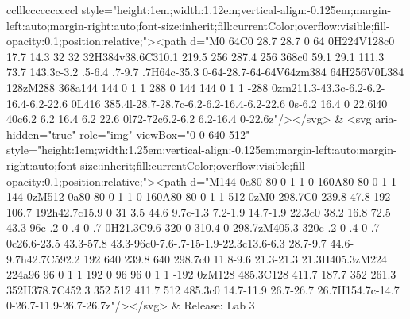 \documentclass[
]{article}
\begin{document}
\begin{figure*}
\begin{longtable*}{cclllccccccccccl}
style="height:1em;width:1.12em;vertical-align:-0.125em;margin-left:auto;margin-right:auto;font-size:inherit;fill:currentColor;overflow:visible;fill-opacity:0.1;position:relative;"><path d="M0 64C0 28.7 28.7 0 64 0H224V128c0 17.7 14.3 32 32 32H384v38.6C310.1 219.5 256 287.4 256 368c0 59.1 29.1 111.3 73.7 143.3c-3.2 .5-6.4 .7-9.7 .7H64c-35.3 0-64-28.7-64-64V64zm384 64H256V0L384 128zM288 368a144 144 0 1 1 288 0 144 144 0 1 1 -288 0zm211.3-43.3c-6.2-6.2-16.4-6.2-22.6 0L416 385.4l-28.7-28.7c-6.2-6.2-16.4-6.2-22.6 0s-6.2 16.4 0 22.6l40 40c6.2 6.2 16.4 6.2 22.6 0l72-72c6.2-6.2 6.2-16.4 0-22.6z"/></svg> & <svg aria-hidden="true" role="img" viewBox="0 0 640 512" style="height:1em;width:1.25em;vertical-align:-0.125em;margin-left:auto;margin-right:auto;font-size:inherit;fill:currentColor;overflow:visible;fill-opacity:0.1;position:relative;"><path d="M144 0a80 80 0 1 1 0 160A80 80 0 1 1 144 0zM512 0a80 80 0 1 1 0 160A80 80 0 1 1 512 0zM0 298.7C0 239.8 47.8 192 106.7 192h42.7c15.9 0 31 3.5 44.6 9.7c-1.3 7.2-1.9 14.7-1.9 22.3c0 38.2 16.8 72.5 43.3 96c-.2 0-.4 0-.7 0H21.3C9.6 320 0 310.4 0 298.7zM405.3 320c-.2 0-.4 0-.7 0c26.6-23.5 43.3-57.8 43.3-96c0-7.6-.7-15-1.9-22.3c13.6-6.3 28.7-9.7 44.6-9.7h42.7C592.2 192 640 239.8 640 298.7c0 11.8-9.6 21.3-21.3 21.3H405.3zM224 224a96 96 0 1 1 192 0 96 96 0 1 1 -192 0zM128 485.3C128 411.7 187.7 352 261.3 352H378.7C452.3 352 512 411.7 512 485.3c0 14.7-11.9 26.7-26.7 26.7H154.7c-14.7 0-26.7-11.9-26.7-26.7z"/></svg> & Release: Lab 3 \\ 

\end{longtable*}
\end{figure*}
\end{document}

